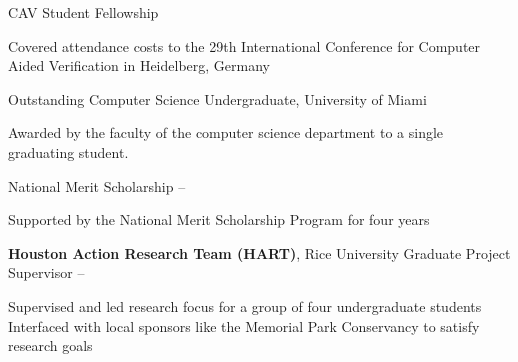 \documentclass[letterpaper,MMMyyyy,nonstopmode]{simpleresumecv}
\begin{document}
\begin{Body}


\nocite{*}

\Gap
{}
\Gap
\printbibliography[heading=none,type=article]

\Gap
{}
\Gap
\printbibliography[heading=none,type=inproceedings]

\pagebreak



\Gap
\BulletItem CAV Student Fellowship
\hfill
{}
\begin{Detail}
\Item Covered attendance costs to the 29th International Conference for Computer Aided Verification in Heidelberg, Germany
\end{Detail}

\Gap
\BulletItem Outstanding Computer Science Undergraduate, University of Miami
\hfill
{}
\begin{Detail}
\Item Awarded by the faculty of the computer science department to a single graduating student.
\end{Detail}

\Gap
\BulletItem National Merit Scholarship
\hfill
{} -- 
\begin{Detail}
\Item Supported by the National Merit Scholarship Program for four years
\end{Detail}



\Entry
\textbf{Houston Action Research Team (HART)}, Rice University
\Gap
\BulletItem Graduate Project Supervisor
\hfill {} -- 
\begin{Detail}
\SubBulletItem Supervised and led research focus for a group of four undergraduate students
\SubBulletItem Interfaced with local sponsors like the Memorial Park Conservancy to satisfy research goals
\end{Detail}


\end{Body}
\end{document}

